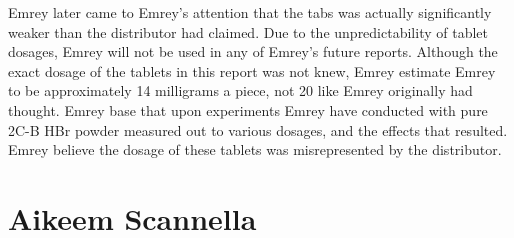 \documentclass[12pt]{book}
\begin{document}
Emrey later came to Emrey's attention that the tabs was actually significantly weaker than the distributor had claimed. Due to the unpredictability of tablet dosages, Emrey will not be used in any of Emrey's future reports. Although the exact dosage of the tablets in this report was not knew, Emrey estimate Emrey to be approximately 14 milligrams a piece, not 20 like Emrey originally had thought. Emrey base that upon experiments Emrey have conducted with pure 2C-B HBr powder measured out to various dosages, and the effects that resulted. Emrey believe the dosage of these tablets was misrepresented by the distributor.



\chapter{Aikeem Scannella}
\end{document}
